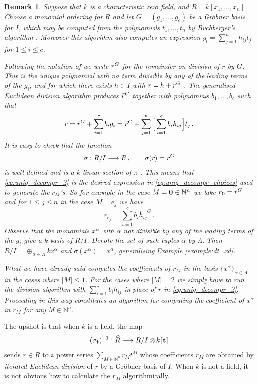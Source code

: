 \documentclass[english,letter paper,12pt,leqno]{article}
\theoremstyle{example}
\newtheorem{remark}[theorem]{Remark}
\numberwithin{equation}{section}
\def\be{\begin{equation}}
\def\ee{\end{equation}}
\begin{document}
\begin{remark}\label{remark:grobner} Suppose that $k$ is a characteristic zero field, and $R = k[x_1,\ldots,x_n]$. Choose a monomial ordering for $R$ and let $G = (g_1,\ldots,g_c)$ be a Gr\"obner basis for $I$, which may be computed from the polynomials $t_1,\ldots,t_n$ by Buchberger's algorithm \cite[\S 2.7]{cox_little_oshea}. Moreover this algorithm also computes an expression $g_i = \sum_{j=1}^n h_{ij} t_j$ for $1 \le i \le c$.

Following the notation of \cite{cox_little_oshea} we write $\Bar{r}^G$ for the remainder on division of $r$ by $G$. This is the unique polynomial with no term divisible by any of the leading terms of the $g_i$, and for which there exists $h \in I$ with $r = h + \Bar{r}^G$ \cite[\S 2.6]{cox_little_oshea}. The generalised Euclidean division algorithm produces $\Bar{r}^G$ together with polynomials $b_1,\ldots,b_c$ such that
\be\label{eq:uniq_decompr_2}
r = \Bar{r}^G + \sum_{i=1}^c b_i g_i = \Bar{r}^G + \sum_{j=1}^n \Big[ \sum_{i=1}^c b_i h_{ij} \Big] t_j\,.
\ee
It is easy to check that the function
\[
\sigma: R/I \longrightarrow R\,, \qquad \sigma(r) = \Bar{r}^G
\]
is well-defined and is a $k$-linear section of $\pi$ \cite[Corollary 2, \S 2.6]{cox_little_oshea}. This means that \eqref{eq:uniq_decompr_2} is the desired expression in \eqref{eq:uniq_decompr_choices} used to generate the $r_M$'s. So for example in the case $M = \bold{0} \in \mathbb{N}^n$ we take $r_{\bold{0}} = \Bar{r}^G$ and for $1 \le j \le n$ in the case $M = e_j$ we have
\[
r_{e_j} = \sum_{i=1}^c \overline{b_i h_{ij} }^G\,.
\]
Observe that the monomials $x^\alpha$ with $\alpha$ not divisible by any of the leading terms of the $g_i$ give a $k$-basis of $R/I$. Denote the set of such tuples $\alpha$ by $\Lambda$. Then $R/I = \oplus_{\alpha \in \Lambda} k x^\alpha$ and $\sigma(x^\alpha) = x^\alpha$, generalising Example \ref{example:dt_xd}. 

What we have already said computes the coefficients of $r_M$ in the basis $\{x^\alpha\}_{\alpha \in \Lambda}$ in the cases where $|M| \le 1$. For the cases where $|M| = 2$ we simply have to run the division algorithm with $\sum_{i=1}^c b_i h_{ij}$ in place of $r$ in \eqref{eq:uniq_decompr_2}. Proceeding in this way constitutes an algorithm for computing the coefficient of $x^\alpha$ in $r_M$ for any $M \in \mathbb{N}^n$.
\end{remark}

The upshot is that when $k$ is a field, the map
\[
(\sigma_{\bold{t}})^{-1}: \widehat{R} \longrightarrow R/I \otimes k \llbracket \bold{t} \rrbracket
\]
sends $r \in R$ to a power series $\sum_{M \in \mathbb{N}^n} r_M t^M$ whose coefficients $r_M$ are obtained by \emph{iterated Euclidean division} of $r$ by a Gr\"obner basis of $I$. When $k$ is not a field, it is not obvious how to calculate the $r_M$ algorithmically.
\end{document}
